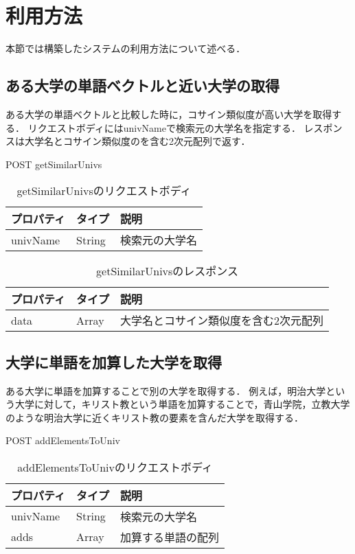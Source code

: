 \section{利用方法}
本節では構築したシステムの利用方法について述べる．

\subsection{ある大学の単語ベクトルと近い大学の取得}
ある大学の単語ベクトルと比較した時に，コサイン類似度が高い大学を取得する．
リクエストボディにはunivNameで検索元の大学名を指定する．
レスポンスは大学名とコサイン類似度のを含む2次元配列で返す．

POST getSimilarUnivs

\begin{table}[htbp]
\caption{getSimilarUnivsのリクエストボディ}
\centering
\begin{tabular}{lll}
\hline
プロパティ & タイプ & 説明
\\ \hline \hline
univName & String & 検索元の大学名\\  \hline
\end{tabular}
\end{table}

\begin{table}[htbp]
\caption{getSimilarUnivsのレスポンス}
\centering
\begin{tabular}{lll}
\hline
プロパティ & タイプ & 説明
\\ \hline \hline
data & Array & 大学名とコサイン類似度を含む2次元配列\\  \hline
\end{tabular}
\end{table}

\subsection{大学に単語を加算した大学を取得}
ある大学に単語を加算することで別の大学を取得する．
例えば，明治大学という大学に対して，キリスト教という単語を加算することで，青山学院，立教大学のような明治大学に近くキリスト教の要素を含んだ大学を取得する．

POST addElementsToUniv

\begin{table}[htbp]
\caption{addElementsToUnivのリクエストボディ}
\centering
\begin{tabular}{lll}
\hline
プロパティ & タイプ & 説明
\\ \hline \hline
univName & String & 検索元の大学名\\
adds & Array & 加算する単語の配列\\  \hline
\end{tabular}
\end{table}

